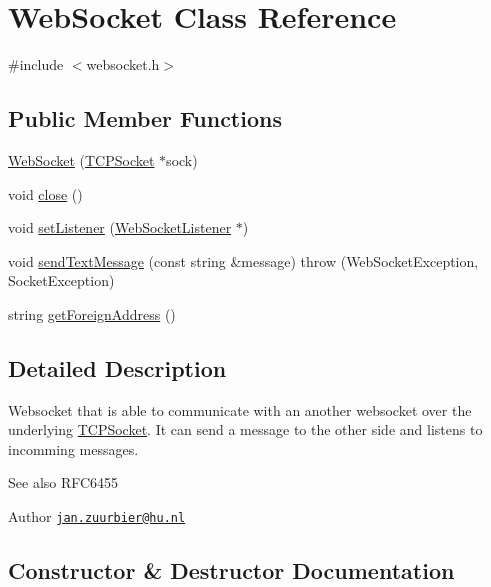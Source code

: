 \hypertarget{class_web_socket}{}\section{Web\+Socket Class Reference}
\label{class_web_socket}


{\ttfamily \#include $<$websocket.\+h$>$}

\subsection*{Public Member Functions}
\begin{DoxyCompactItemize}
\item 
\hyperlink{class_web_socket_a69115b798613ceaeccec47bf8609e779}{Web\+Socket} (\hyperlink{class_t_c_p_socket}{T\+C\+P\+Socket} $\ast$sock)
\item 
void \hyperlink{class_web_socket_abef10acf60b4d5b87399e6f9c5ad808d}{close} ()
\item 
void \hyperlink{class_web_socket_aeaf7a014237f6d326ffef03651243c42}{set\+Listener} (\hyperlink{class_web_socket_listener}{Web\+Socket\+Listener} $\ast$)
\item 
void \hyperlink{class_web_socket_ad3a332147420ee0ce12767dc51621fc6}{send\+Text\+Message} (const string \&message)  throw (\+Web\+Socket\+Exception, Socket\+Exception)
\item 
string \hyperlink{class_web_socket_a2ab2cf768749032fb550daa935b789af}{get\+Foreign\+Address} ()
\end{DoxyCompactItemize}


\subsection{Detailed Description}
Websocket that is able to communicate with an another websocket over the underlying \hyperlink{class_t_c_p_socket}{T\+C\+P\+Socket}. It can send a message to the other side and listens to incomming messages. \begin{DoxySeeAlso}{See also}
R\+F\+C6455 
\end{DoxySeeAlso}
\begin{DoxyAuthor}{Author}
\href{mailto:jan.zuurbier@hu.nl}{\tt jan.\+zuurbier@hu.\+nl} 
\end{DoxyAuthor}


\subsection{Constructor \& Destructor Documentation}
